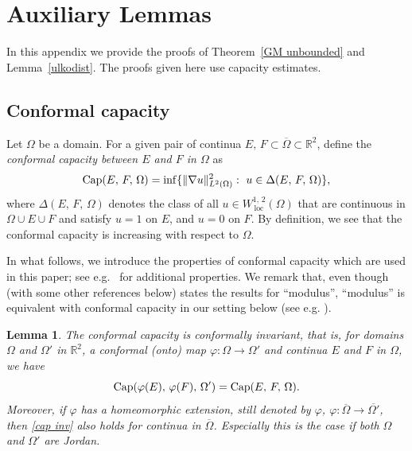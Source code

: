 \documentclass[reqno,11pt]{amsart}
\makeatletter
\def\loc{{\mathop\mathrm{\,loc\,}}}
\newtheorem{lem}[thm]{Lemma}%
\numberwithin{equation}{section}
\theoremstyle{remark}
\makeatother
\begin{document}
\appendix

\section{Auxiliary Lemmas}

In this appendix we provide the proofs of Theorem~\ref{GM unbounded} and Lemma~\ref{ulkodist}. The proofs given here use  capacity estimates. 

\subsection{Conformal capacity}


Let $\Omega$ be a  domain. For a given pair of continua $E,\,F \subset \overline \Omega\subset \mathbb R^2$, 
define the {\it conformal capacity between $E$ and $F$ in $\Omega$} as
 $${\rm Cap}(E,\,F,\,\Omega)=\inf\{\|\nabla u\|^2_{L^{2} (\Omega)}: \ u\in\Delta(E,\,F,\,\Omega )\},$$
 where $\Delta(E,\,F,\,\Omega )$ denotes the class of all $u\in W^{1,\,2}_{\loc}(\Omega)$ that are continuous
in $\Omega\cup E\cup F$ and satisfy $u=1$ on $E$, and $u=0$ on $F$. 
By definition, we see that the conformal capacity is increasing with respect to
$\Omega.$  

In what follows, we introduce the properties of conformal capacity which are used in this paper; see e.g.\ \cite[Chapter 1]{V1971} for additional properties. We remark that, even though \cite{V1971} (with some other references below) states the results for ``modulus'',   ``modulus'' is equivalent with
conformal capacity in our setting below (see e.g. \cite[ Proposition 10.2, Page 54]{R1993}). 




\begin{lem}
The conformal capacity is conformally invariant, that is, for  domains $\Omega$ and $\Omega'$ in $\mathbb R^2$, a conformal (onto) map $\varphi \colon \Omega \to \Omega'$ and continua $E$ and $F$ in $\Omega$, we have
\begin{equation}\label{cap inv}
{\rm Cap}(\varphi(E),\,\varphi(F),\,\Omega') = {\rm Cap}(E,\,F,\,\Omega).
\end{equation}
Moreover, if $\varphi$ has a homeomorphic extension, still denoted by  $\varphi$, $\varphi\colon \overline{\Omega}\to \overline{\Omega'}$, then \eqref{cap inv} also holds for continua in $\overline{\Omega}$. Especially this is the case if both $\Omega$ and $\Omega'$ are Jordan. 
\end{lem}
\end{document}

